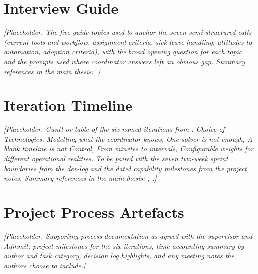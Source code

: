 \section{Interview Guide}
\label{app:interview-guide}

\textit{[Placeholder. The five guide topics used to anchor the seven semi-structured calls (current tools and workflow, assignment criteria, sick-leave handling, attitudes to automation, adoption criteria), with the broad opening question for each topic and the prompts used where coordinator answers left an obvious gap. Summary references in the main thesis: .]}


\section{Iteration Timeline}
\label{app:iterations}

\textit{[Placeholder. Gantt or table of the six named iterations from : Choice of Technologies, Modelling what the coordinator knows, One solver is not enough, A blank timeline is not Control, From minutes to intervals, Configurable weights for different operational realities. To be paired with the seven two-week sprint boundaries from the dev-log and the dated capability milestones from the project notes. Summary references in the main thesis: , .]}


\section{Project Process Artefacts}
\label{app:process}

\textit{[Placeholder. Supporting process documentation as agreed with the supervisor and Admmit: project milestones for the six iterations, time-accounting summary by author and task category, decision log highlights, and any meeting notes the authors choose to include.]}
